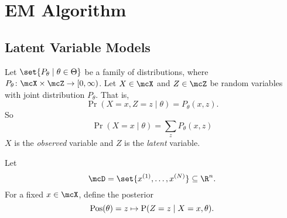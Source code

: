 \chapter{EM Algorithm} \label{chp:em}
\section{Latent Variable Models} \label{sec:latent}

Let $\set{P_\theta \mid \theta \in \Theta}$ be a family of distributions,
where $P_\theta\colon \mcX \times \mcZ \to [0, \infty)$.
Let $X \in \mcX$ and $Z \in \mcZ$ be random variables with joint
distribution $P_\theta$.
That is, \[
    \Pr(X = x, Z = z \mid \theta) = P_\theta(x, z).
\] So \[
    \Pr(X = x \mid \theta) = \sum_z P_\theta(x, z)
\]
$X$ is the \emph{observed} variable and $Z$ is the \emph{latent} variable.

Let \[
    \mcD = \set{x^{(1)}, \ldots, x^{(N)}} \subseteq \R^n.
\]
For a fixed $x \in \mcX$, define the posterior \[
    \operatorname{Pos}(\theta) = z \mapsto \operatorname{P}(Z = z \mid X = x, \theta).
\]

